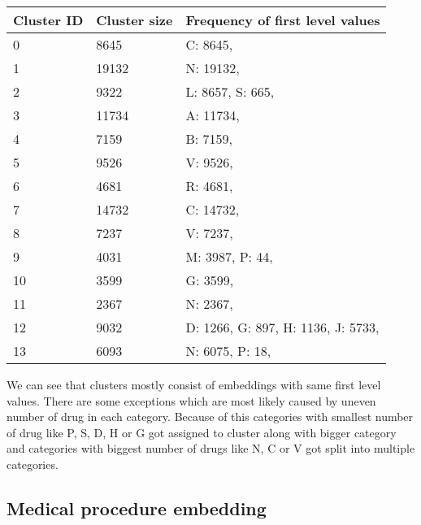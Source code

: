\begin{table}[!h]
	\begin{tabular}{|p{}|p{}|p{}|}
		\hline
		Cluster ID & Cluster size & Frequency of first level values \\ \hline
		0 & 8645 & C: 8645, \\ \hline
		1 & 19132 & N: 19132, \\ \hline
		2 & 9322 & L: 8657, S: 665, \\ \hline
		3 & 11734 & A: 11734, \\ \hline
		4 & 7159 & B: 7159, \\ \hline
		5 & 9526 & V: 9526, \\ \hline
		6 & 4681 & R: 4681, \\ \hline
		7 & 14732 & C: 14732, \\ \hline
		8 & 7237 & V: 7237, \\ \hline
		9 & 4031 & M: 3987, P: 44, \\ \hline
		10 & 3599 & G: 3599, \\ \hline
		11 & 2367 & N: 2367, \\ \hline
		12 & 9032 & D: 1266, G: 897, H: 1136, J: 5733, \\ \hline
		13 & 6093 & N: 6075, P: 18, \\ \hline
\end{tabular}
\end{table}

We can see that clusters mostly consist of embeddings with same first level values. There are some exceptions which are most likely caused by uneven number of drug in each category. Because of this categories with smallest number of drug like P, S, D, H or G got assigned to cluster along with bigger category and categories with biggest number of drugs like N, C or V got split into multiple categories.  

\subsection{Medical procedure embedding}


